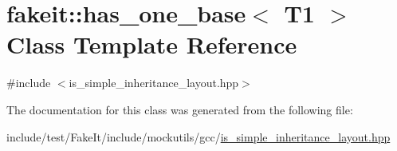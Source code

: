 \hypertarget{classfakeit_1_1has__one__base}{}\section{fakeit\+::has\+\_\+one\+\_\+base$<$ T1 $>$ Class Template Reference}
\label{classfakeit_1_1has__one__base}


{\ttfamily \#include $<$is\+\_\+simple\+\_\+inheritance\+\_\+layout.\+hpp$>$}



The documentation for this class was generated from the following file\+:\begin{DoxyCompactItemize}
\item 
include/test/\+Fake\+It/include/mockutils/gcc/\mbox{\hyperlink{is__simple__inheritance__layout_8hpp}{is\+\_\+simple\+\_\+inheritance\+\_\+layout.\+hpp}}\end{DoxyCompactItemize}
